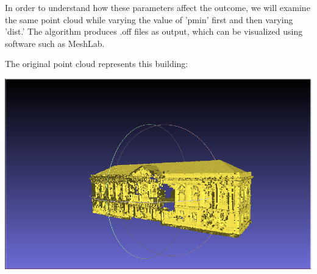 \documentclass{article}
\begin{document}
In order to understand how these parameters affect the outcome, we will examine the same point cloud while varying the value of 'pmin' first and then varying 'dist.'
The algorithm produces .off files as output, which can be visualized using software such as MeshLab.

\newpage
The original point cloud represents this building:
\vspace{\baselineskip}

\begin{center}
    \includegraphics[scale=0.20]{../../images/screen_kinetic/building.png} 
\end{center}
\end{document}
